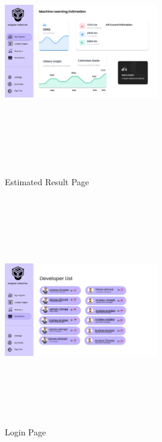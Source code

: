 \begin{figure}[H]
    \centering 
\includegraphics[height=10cm, width=0.6\textwidth]{./images/prototype/0013}
\centering 
\caption{Estimated Result Page}
\label{fig:prototype1}


\includegraphics[height=10cm, width=0.6\textwidth]{./images/prototype/0005}
\caption{Login Page}
\label{fig:prototype1}
\end{figure}

